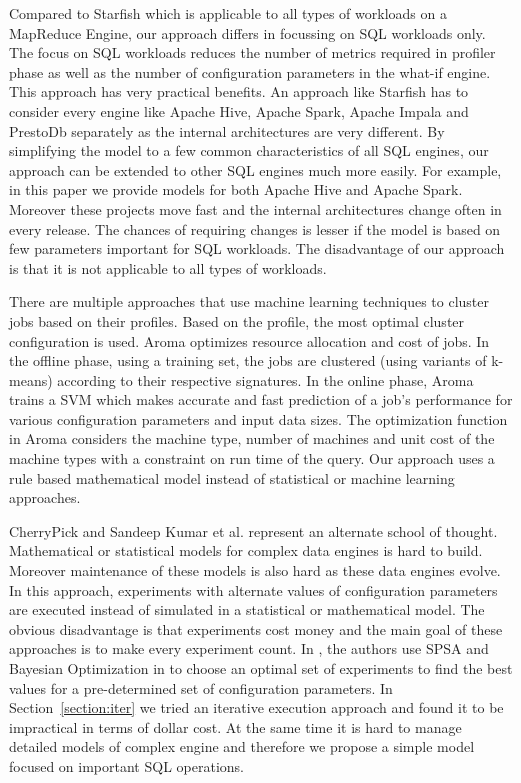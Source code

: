 Compared to Starfish which is applicable to all types of workloads on a MapReduce Engine, our approach differs in focussing on SQL workloads only. The focus on 
SQL workloads reduces the number of metrics required in profiler phase as well as the number of configuration parameters in the what-if engine.
This approach has very practical benefits. An approach like Starfish has to consider every engine like Apache Hive, Apache Spark, Apache Impala and PrestoDb separately
as the internal architectures are very different. By simplifying the model to a few common characteristics of all SQL engines, our approach can be extended
to other SQL engines much more easily. For example, in this paper we provide models for both Apache Hive and Apache Spark. Moreover these projects move 
fast and the internal architectures change often in every release. The chances of requiring changes is lesser if the model is based on few parameters important for SQL workloads.
The disadvantage of our approach is that it is not applicable to all types of workloads. 

There are multiple approaches \cite{wu2013self} \cite{lama2012aroma} that use machine learning techniques
to cluster jobs based on their profiles. Based on the profile, the most optimal cluster configuration is
used. Aroma \cite{lama2012aroma} optimizes resource allocation and cost of jobs. In
the offline phase, using a training set, the jobs are clustered
(using variants of k-means) according to their respective signatures.
In the online phase, Aroma trains a SVM which makes
accurate and fast prediction of a job's performance for various
configuration parameters and input data sizes. The optimization function in Aroma considers
the machine type, number of machines and unit cost of the machine types with a constraint on
run time of the query. Our approach uses a rule based mathematical model instead of statistical or machine learning approaches. 
 
CherryPick\cite{LiMinZeng} and Sandeep Kumar et al.\cite{KumarPLPGB16} represent an alternate school of thought.
Mathematical or statistical models for complex data engines is hard to build. Moreover maintenance of these models 
is also hard as these data engines evolve. In this approach, experiments
with alternate values of configuration parameters are executed instead of simulated in a 
statistical or mathematical model. The obvious disadvantage is that experiments cost money and the main 
goal of these approaches is to make every experiment count. In \cite{KumarPLPGB16}, the authors use SPSA and Bayesian Optimization in \cite{LiMinZeng} 
to choose an optimal set of experiments to find the best values for a pre-determined set of configuration parameters.
In Section~\ref{section:iter} we tried an iterative execution approach and found it to be impractical in terms of dollar cost. 
At the same time it is hard to manage detailed models of complex engine and therefore
we propose a simple model focused on important SQL operations.
  
